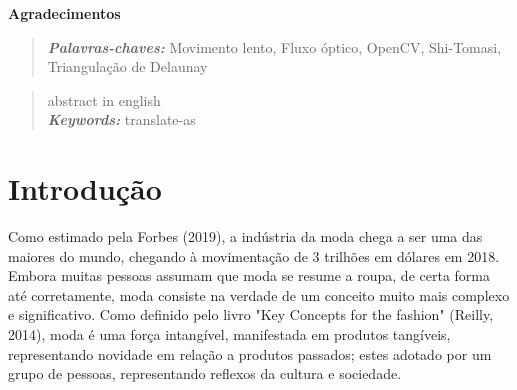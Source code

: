 \documentclass[12pt]{report}
\providecommand{\keywords}[1]{\textbf{\textit{Keywords: }} #1}
\providecommand{\palavrasChaves}[1]{\textbf{\textit{Palavras-chaves: }} #1}
\begin{document}


\begin{center}
{\bf \Large Agradecimentos}
\end{center}



\newpage

\begin{abstract}

  \palavrasChaves{Movimento lento, Fluxo óptico, OpenCV, Shi-Tomasi,
    Triangulação de Delaunay}
    
\end{abstract}

\newpage


\begin{abstract}
  abstract in english
  \\
  \keywords{translate-as}

\end{abstract}

\newpage



\listoffigures

\newpage


{\centering
\printacronyms[include-classes=abbrev,name=Abreviações]
}
\tableofcontents


\newpage



\chapter{Introdução}
\label{cha:introducao}

Como estimado pela Forbes (2019), a indústria da moda chega a ser uma das maiores do mundo, chegando à movimentação de 3 trilhões em dólares em 2018. Embora muitas pessoas assumam que moda se resume a roupa, de certa forma até corretamente, moda consiste na verdade de um conceito muito mais complexo e significativo. Como definido pelo livro "Key Concepts for the fashion" (Reilly, 2014), moda é uma força intangível, manifestada em produtos tangíveis, representando novidade em relação a produtos passados; estes adotado por um grupo de pessoas, representando reflexos da cultura e sociedade. 
\end{document}
